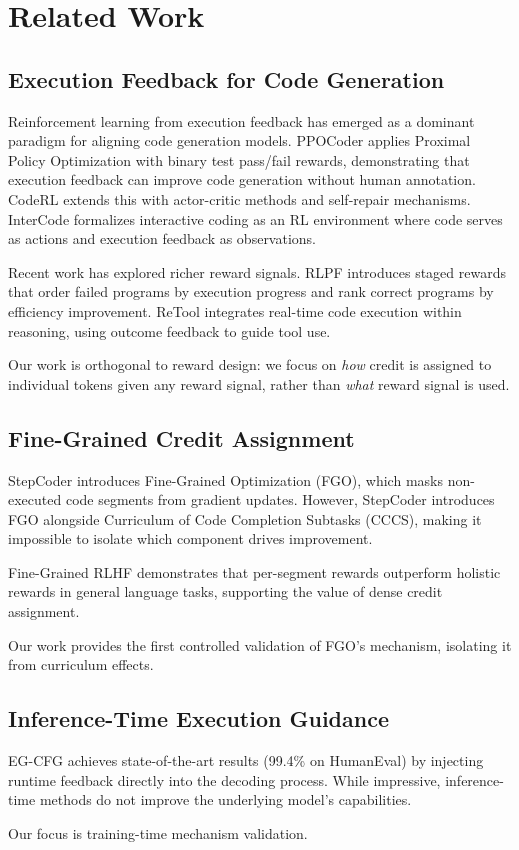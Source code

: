 \section{Related Work}

\subsection{Execution Feedback for Code Generation}

Reinforcement learning from execution feedback has emerged as a dominant paradigm for aligning code generation models. PPOCoder \citep{shojaee2023ppo} applies Proximal Policy Optimization with binary test pass/fail rewards, demonstrating that execution feedback can improve code generation without human annotation. CodeRL \citep{le2022coderl} extends this with actor-critic methods and self-repair mechanisms. InterCode \citep{yang2023intercode} formalizes interactive coding as an RL environment where code serves as actions and execution feedback as observations.

Recent work has explored richer reward signals. RLPF \citep{jing2026rlpf} introduces staged rewards that order failed programs by execution progress and rank correct programs by efficiency improvement. ReTool \citep{feng2025retool} integrates real-time code execution within reasoning, using outcome feedback to guide tool use.

Our work is orthogonal to reward design: we focus on \emph{how} credit is assigned to individual tokens given any reward signal, rather than \emph{what} reward signal is used.

\subsection{Fine-Grained Credit Assignment}

StepCoder \citep{dou2024stepcoder} introduces Fine-Grained Optimization (FGO), which masks non-executed code segments from gradient updates. However, StepCoder introduces FGO alongside Curriculum of Code Completion Subtasks (CCCS), making it impossible to isolate which component drives improvement.

Fine-Grained RLHF \citep{wu2023finegrained} demonstrates that per-segment rewards outperform holistic rewards in general language tasks, supporting the value of dense credit assignment.

Our work provides the first controlled validation of FGO's mechanism, isolating it from curriculum effects.

\subsection{Inference-Time Execution Guidance}

EG-CFG \citep{lavon2025egcfg} achieves state-of-the-art results (99.4\% on HumanEval) by injecting runtime feedback directly into the decoding process. While impressive, inference-time methods do not improve the underlying model's capabilities.

Our focus is training-time mechanism validation.
